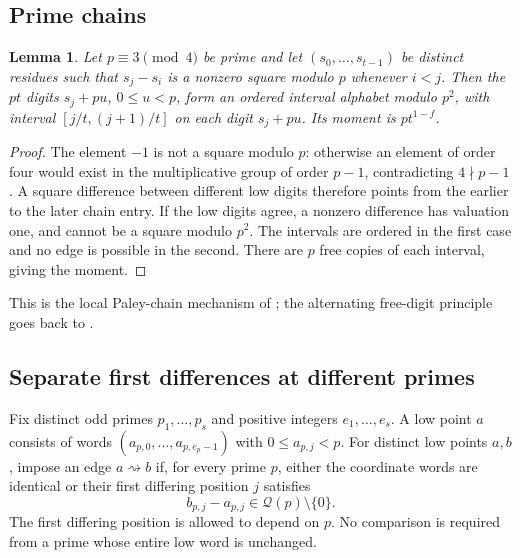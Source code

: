 \documentclass[11pt]{article}
\newtheorem{lemma}[theorem]{Lemma}
\theoremstyle{definition}
\theoremstyle{remark}
\newcommand{\QR}{\mathcal Q}
\begin{document}
\subsection{Prime chains}
\begin{lemma}\label{lem:chain}
Let $p\equiv3\pmod4$ be prime and let $(s_0,\ldots,s_{t-1})$ be distinct
residues such that $s_j-s_i$ is a nonzero square modulo $p$ whenever $i<j$.
Then the $pt$ digits $s_j+pu$, $0\le u<p$, form an ordered interval
alphabet modulo $p^2$, with interval $[j/t,(j+1)/t]$ on each digit
$s_j+pu$. Its moment is $pt^{1-f}$.
\end{lemma}
\begin{proof}
The element $-1$ is not a square modulo $p$: otherwise an element of order
four would exist in the multiplicative group of order $p-1$, contradicting
$4\nmid p-1$. A square difference between different low digits therefore
points from the earlier to the later chain entry. If the low digits agree,
a nonzero difference has valuation one, and cannot be a square modulo $p^2$.
The intervals are ordered in the first case and no edge is possible in the
second. There are $p$ free copies of each interval, giving the moment.
\end{proof}
This is the local Paley-chain mechanism of \cite{Krachun2026}; the
alternating free-digit principle goes back to \cite{Ruzsa1984}.

\subsection{Separate first differences at different primes}
Fix distinct odd primes $p_1,\ldots,p_s$ and positive integers
$e_1,\ldots,e_s$. A low point $a$ consists of words
$(a_{p,0},\ldots,a_{p,e_p-1})$ with $0\le a_{p,j}<p$.
For distinct low points $a,b$, impose an edge $a\rightsquigarrow b$ if,
for every prime $p$, either the coordinate words are identical or their
first differing position $j$ satisfies
\begin{equation}\label{eq:lowedge}
 b_{p,j}-a_{p,j}\in\QR(p)\setminus\{0\}.
\end{equation}
The first differing position is allowed to depend on $p$. No comparison is
required from a prime whose entire low word is unchanged.
\end{document}

